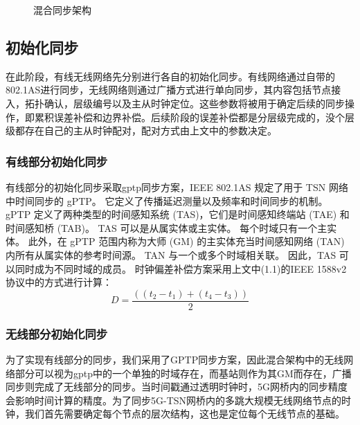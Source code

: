 \documentclass[UTF8,a4paper,12pt]{ctexart}
\numberwithin{equation}{section}
\begin{document}
\begin{figure}[htb]
	\caption{\label{1} 混合同步架构}
\end{figure}

\subsection{初始化同步}

在此阶段，有线无线网络先分别进行各自的初始化同步。有线网络通过自带的802.1AS进行同步，无线网络则通过广播方式进行单向同步，其内容包括节点接入，拓扑确认，层级编号以及主从时钟定位。这些参数将被用于确定后续的同步操作，即累积误差补偿和边界补偿。后续阶段的误差补偿都是分层级完成的，没个层级都存在自己的主从时钟配对，配对方式由上文中的参数决定。
\subsubsection{有线部分初始化同步}

有线部分的初始化同步采取gptp同步方案，IEEE 802.1AS 规定了用于 TSN 网络中时间同步的 gPTP。 它定义了传播延迟测量以及频率和时间同步的机制。 gPTP 定义了两种类型的时间感知系统 (TAS)，它们是时间感知终端站 (TAE) 和时间感知桥 (TAB)。 TAS 可以是从属实体或主实体。 每个时域只有一个主实体。 此外，在 gPTP 范围内称为大师 (GM) 的主实体充当时间感知网络 (TAN) 内所有从属实体的参考时间源。 TAN 与一个或多个时域相关联。 因此，TAS 可以同时成为不同时域的成员。
时钟偏差补偿方案采用上文中(1.1)的IEEE 1588v2协议中的方式进行计算：
\begin{equation}
	D = \frac{((t_2-t_1)+(t_4-t_3))}{2} 
\end{equation}
\subsubsection{无线部分初始化同步}
为了实现有线部分的同步，我们采用了GPTP同步方案，因此混合架构中的无线网络部分可以视为gptp中的一个单独的时域存在，而基站则作为其GM而存在，广播同步则完成了无线部分的同步。当时间戳通过透明时钟时，5G网桥内的同步精度会影响时间计算的精度。为了同步5G-TSN网桥内的多跳大规模无线网络节点的时钟，我们首先需要确定每个节点的层次结构，这也是定位每个无线节点的基础。
\end{document}
